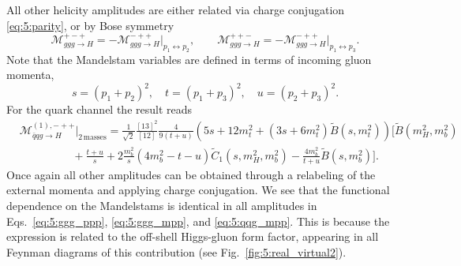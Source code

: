 All other helicity amplitudes are either related via charge conjugation \eqref{eq:5:parity}, or by Bose symmetry
\begin{equation}
\mathcal{M}_{ggg \rightarrow H}^{+-+} = -\mathcal{M}_{ggg \rightarrow H}^{-++} \bigg \vert_{p_1 \leftrightarrow p_2}, \qquad \mathcal{M}_{ggg \rightarrow H}^{++-} = -\mathcal{M}_{ggg \rightarrow H}^{-++} \bigg \vert_{p_1 \leftrightarrow p_3}.
\label{eq:5:momentum_exchange}
\end{equation}
Note that the Mandelstam variables are defined in terms of incoming gluon momenta, \ie\
\begin{equation}
s = (p_1 + p_2)^2, \quad t = (p_1 + p_3)^2, \quad u = (p_2 + p_3)^2.
\end{equation}
For the quark channel the result reads
\begin{equation}
\begin{split}
&\mathcal{M}_{\bar{q}q g \rightarrow H}^{(1),-++} \bigg \vert_{2\, \text{masses}} =  \frac{1}{\sqrt{2}} \frac{[13]^2}{[12]}  \frac{4 }{9 (t + u)} \left(5 s + 12 m_t^2 + (3 s + 6 m_t^2) \tilde{B}\!(s, m_t^2) \right)\bigg [\tilde{B}\!(m_H^2, m_b^2) \\
& \hspace{2cm}  + \frac{t + u}{s} + 2 \frac{m_b^2}{s} \left(4m_b^2 - t - u  \right) \tilde{C}_1\!(s, m_H^2, m_b^2) - \frac{4 m_b^2}{t + u}\tilde{B}\!(s, m_b^2) \bigg ].
\label{eq:5:qqg_mpp}
\end{split}
\end{equation}
Once again all other amplitudes can be obtained through a relabeling of the external momenta and applying charge conjugation. We see that the functional dependence on the Mandelstams is identical in all amplitudes in Eqs.~\eqref{eq:5:ggg_ppp}, \eqref{eq:5:ggg_mpp}, and \eqref{eq:5:qqg_mpp}. This is because the expression is related to the off-shell Higgs-gluon form factor, appearing in all Feynman diagrams of this contribution (see Fig.~\ref{fig:5:real_virtual2}).

